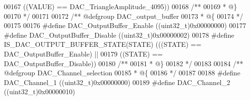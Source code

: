 \begin{DoxyCode}
00167                                                       \textcolor{preprocessor}{(}\textcolor{preprocessor}{(}\textcolor{preprocessor}{VALUE}\textcolor{preprocessor}{)} \textcolor{preprocessor}{==} 
      DAC_TriangleAmplitude_4095\textcolor{preprocessor}{)}\textcolor{preprocessor}{)}
00168 \textcolor{comment}{/**}
00169 \textcolor{comment}{  * @\}}
00170 \textcolor{comment}{  */}
00171 
00172 \textcolor{comment}{/** @defgroup DAC\_output\_buffer }
00173 \textcolor{comment}{  * @\{}
00174 \textcolor{comment}{  */}
00175 
00176 \textcolor{preprocessor}{#}\textcolor{preprocessor}{define} \textcolor{preprocessor}{DAC\_OutputBuffer\_Enable}            \textcolor{preprocessor}{(}\textcolor{preprocessor}{(}\textcolor{preprocessor}{uint32\_t}\textcolor{preprocessor}{)}0x00000000\textcolor{preprocessor}{)}
00177 \textcolor{preprocessor}{#}\textcolor{preprocessor}{define} \textcolor{preprocessor}{DAC\_OutputBuffer\_Disable}           \textcolor{preprocessor}{(}\textcolor{preprocessor}{(}\textcolor{preprocessor}{uint32\_t}\textcolor{preprocessor}{)}0x00000002\textcolor{preprocessor}{)}
00178 \textcolor{preprocessor}{#}\textcolor{preprocessor}{define} \textcolor{preprocessor}{IS\_DAC\_OUTPUT\_BUFFER\_STATE}\textcolor{preprocessor}{(}\textcolor{preprocessor}{STATE}\textcolor{preprocessor}{)} \textcolor{preprocessor}{(}\textcolor{preprocessor}{(}\textcolor{preprocessor}{(}\textcolor{preprocessor}{STATE}\textcolor{preprocessor}{)} \textcolor{preprocessor}{==} 
      DAC_OutputBuffer_Enable\textcolor{preprocessor}{)} \textcolor{preprocessor}{||}
00179                                            \textcolor{preprocessor}{(}\textcolor{preprocessor}{(}\textcolor{preprocessor}{STATE}\textcolor{preprocessor}{)} \textcolor{preprocessor}{==} 
      DAC_OutputBuffer_Disable\textcolor{preprocessor}{)}\textcolor{preprocessor}{)}
00180 \textcolor{comment}{/**}
00181 \textcolor{comment}{  * @\}}
00182 \textcolor{comment}{  */}
00183 
00184 \textcolor{comment}{/** @defgroup DAC\_Channel\_selection }
00185 \textcolor{comment}{  * @\{}
00186 \textcolor{comment}{  */}
00187 
00188 \textcolor{preprocessor}{#}\textcolor{preprocessor}{define} \textcolor{preprocessor}{DAC\_Channel\_1}                      \textcolor{preprocessor}{(}\textcolor{preprocessor}{(}\textcolor{preprocessor}{uint32\_t}\textcolor{preprocessor}{)}0x00000000\textcolor{preprocessor}{)}
00189 \textcolor{preprocessor}{#}\textcolor{preprocessor}{define} \textcolor{preprocessor}{DAC\_Channel\_2}                      \textcolor{preprocessor}{(}\textcolor{preprocessor}{(}\textcolor{preprocessor}{uint32\_t}\textcolor{preprocessor}{)}0x00000010\textcolor{preprocessor}{)}

\end{DoxyCode}

